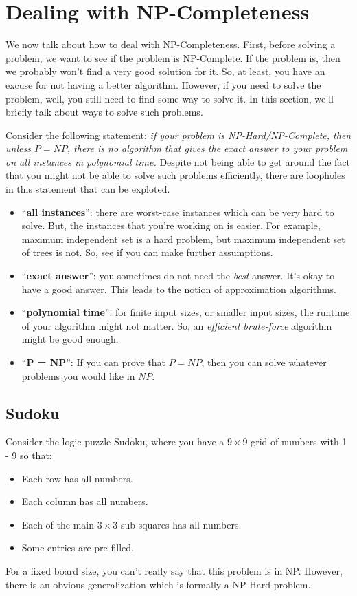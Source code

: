 \documentclass[letterpaper]{article}
\begin{document}
\section{Dealing with NP-Completeness}
We now talk about how to deal with NP-Completeness. First, before solving a problem, we want to see if the problem is NP-Complete. If the problem is, then we probably won't find a very good solution for it. So, at least, you have an excuse for not having a better algorithm. However, if you need to solve the problem, well, you still need to find some way to solve it. In this section, we'll briefly talk about ways to solve such problems. 

\bigskip 

Consider the following statement: \emph{if your problem is NP-Hard/NP-Complete, then unless $P = NP$, there is no algorithm that gives the exact answer to your problem on all instances in polynomial time.} Despite not being able to get around the fact that you might not be able to solve such problems efficiently, there are loopholes in this statement that can be exploted.
\begin{itemize}
    \item ``\textbf{all instances}'': there are worst-case instances which can be very hard to solve. But, the instances that you're working on is easier. For example, maximum independent set is a hard problem, but maximum independent set of trees is not. So, see if you can make further assumptions. 
    \item ``\textbf{exact answer}'': you sometimes do not need the \emph{best} answer. It's okay to have a good answer. This leads to the notion of approximation algorithms. 
    \item ``\textbf{polynomial time}'': for finite input sizes, or smaller input sizes, the runtime of your algorithm might not matter. So, an \emph{efficient brute-force} algorithm might be good enough. 
    \item ``\textbf{P = NP}'': If you can prove that $P = NP$, then you can solve whatever problems you would like in $NP$. 
\end{itemize}

\subsection{Sudoku}
Consider the logic puzzle Sudoku, where you have a $9 \times 9$ grid of numbers with 1 - 9 so that:
\begin{itemize}
    \item Each row has all numbers. 
    \item Each column has all numbers. 
    \item Each of the main $3 \times 3$ sub-squares has all numbers. 
    \item Some entries are pre-filled. 
\end{itemize}
For a fixed board size, you can't really say that this problem is in NP. However, there is an obvious generalization which is formally a NP-Hard problem. 
\end{document}
